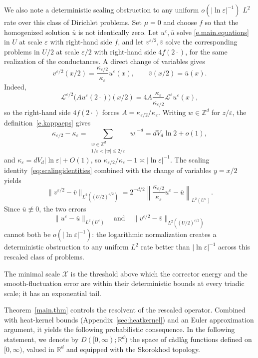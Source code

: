 \documentclass[11pt]{amsart}
\theoremstyle{plain}
\theoremstyle{definition}
\theoremstyle{remark}
\newcommand{\Zd}{\mathbb{Z}^d}
\newcommand{\Rd}{\mathbb{R}^d}
\newcommand{\eps}{\varepsilon}
\begin{document}
	We also note a deterministic scaling obstruction to any
	uniform $o(|\ln\eps|^{-1})$ $L^2$ rate over this class of Dirichlet problems.
	Set $\mu = 0$ and choose $f$ so that the homogenized solution $\bar u$ is not
	identically zero. Let $u^\eps, \bar u$ solve \eqref{e.main.equations} in $U$
	at
	scale $\eps$ with right-hand side $f$, and let $v^{\eps/2}, \bar v$ solve the
	corresponding problems in $U/2$ at scale $\eps/2$ with right-hand side
	$4 f(2\cdot)$, for the same realization of the conductances. A direct change
	of variables gives
	\begin{equation} \label{eq:scalingidentities}
		v^{\eps/2}(x/2) = \frac{\kappa_{\eps/2}}{\kappa_\eps} u^\eps(x),
		\qquad
		\bar v(x/2) = \bar u(x).
	\end{equation}
	Indeed,
	\[
	\mathcal L^{\eps/2}\bigl(A u^\eps(2\cdot)\bigr)(x/2)
	= 4A \frac{\kappa_\eps}{\kappa_{\eps/2}} \mathcal L^\eps u^\eps(x),
	\]
	so the right-hand side $4 f(2\cdot)$ forces
	$A = \kappa_{\eps/2}/\kappa_\eps$. Writing $w \in \Zd$ for $z/\eps$, the definition~\eqref{e.kappaeps} gives
	\[
	\kappa_{\eps/2} - \kappa_\eps = \sum_{\substack{w \in \Zd \\ 1/\eps < |w| \le 2/\eps}} |w|^{-d} = d V_d \ln 2 + o(1),
	\]
	and $\kappa_\eps = d V_d |\ln\eps| + O(1)$, so $\kappa_{\eps/2}/\kappa_\eps - 1 \asymp |\ln\eps|^{-1}$.
	The scaling identity~\eqref{eq:scalingidentities} combined with the change of variables $y = x/2$ yields
	\[
	\|v^{\eps/2} - \bar v\|_{L^2((U/2)^{\eps/2})} = 2^{-d/2} \left\| \frac{\kappa_{\eps/2}}{\kappa_\eps} u^\eps - \bar u \right\|_{L^2(U^\eps)}.
	\]
	Since $\bar u \not\equiv 0$, the two errors
	\[
	\|u^\eps - \bar u\|_{L^2(U^\eps)}
	\quad\text{and}\quad
	\|v^{\eps/2} - \bar v\|_{L^2((U/2)^{\eps/2})}
	\]
	cannot both be $o(|\ln\eps|^{-1})$: the logarithmic normalization creates a
	deterministic obstruction to any uniform $L^2$ rate better than
	$\left|\ln\eps\right|^{-1}$ across this rescaled class of problems.
	
	
	The minimal scale $\mathcal{X}$ is the threshold above which the corrector energy and the smooth-fluctuation error are within their deterministic bounds at every triadic scale; it has an exponential tail.
	
	Theorem~\ref{main.thm} controls the resolvent of the rescaled operator.
	Combined with heat-kernel bounds (Appendix~\ref{sec:heatkernel}) and an Euler approximation argument, it yields the following probabilistic consequence. In the following statement, we denote by $D([0,\infty); \Rd)$ the space of c\`adl\`ag functions defined on $[0,\infty)$, valued in $\Rd$ and equipped with the Skorokhod topology.
	
\end{document}
